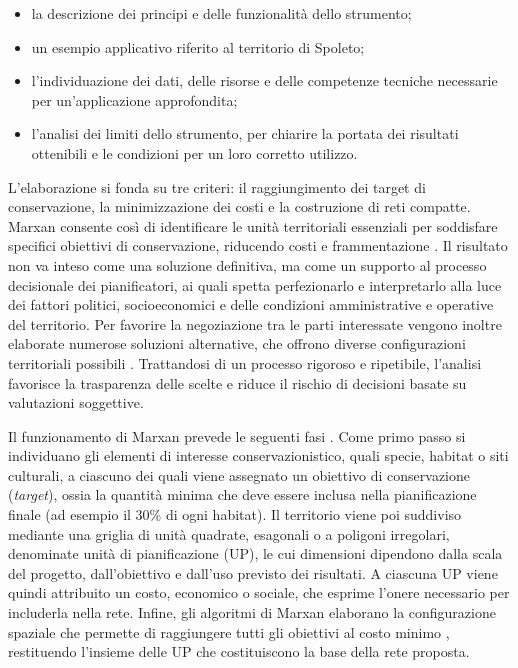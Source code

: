 \documentclass[
  a4paper,
]{book}
\providecommand{\tightlist}{%
  \setlength{\itemsep}{0pt}\setlength{\parskip}{0pt}}
\begin{document}
\begin{itemize}
\tightlist
\item
  la descrizione dei principi e delle funzionalità dello strumento;
\item
  un esempio applicativo riferito al territorio di Spoleto;
\item
  l'individuazione dei dati, delle risorse e delle competenze tecniche necessarie per un'applicazione approfondita;
\item
  l'analisi dei limiti dello strumento, per chiarire la portata dei risultati ottenibili e le condizioni per un loro corretto utilizzo.
\end{itemize}

L'elaborazione si fonda su tre criteri: il raggiungimento dei target di conservazione, la minimizzazione dei costi e la costruzione di reti compatte.
Marxan consente così di identificare le unità territoriali essenziali per soddisfare specifici obiettivi di conservazione, riducendo costi e frammentazione \citep{ball2009}.
Il risultato non va inteso come una soluzione definitiva, ma come un supporto al processo decisionale dei pianificatori, ai quali spetta perfezionarlo e interpretarlo alla luce dei fattori politici, socioeconomici e delle condizioni amministrative e operative del territorio.
Per favorire la negoziazione tra le parti interessate vengono inoltre elaborate numerose soluzioni alternative, che offrono diverse configurazioni territoriali possibili \citep{ardron2010, serra-sogas2020}.
Trattandosi di un processo rigoroso e ripetibile, l'analisi favorisce la trasparenza delle scelte e riduce il rischio di decisioni basate su valutazioni soggettive.

Il funzionamento di Marxan prevede le seguenti fasi \citep{serra-sogas2020}.
Come primo passo si individuano gli elementi di interesse conservazionistico, quali specie, habitat o siti culturali, a ciascuno dei quali viene assegnato un obiettivo di conservazione (\emph{target}), ossia la quantità minima che deve essere inclusa nella pianificazione finale (ad esempio il 30\% di ogni habitat).
Il territorio viene poi suddiviso mediante una griglia di unità quadrate, esagonali o a poligoni irregolari, denominate unità di pianificazione (UP), le cui dimensioni dipendono dalla scala del progetto, dall'obiettivo e dall'uso previsto dei risultati.
A ciascuna UP viene quindi attribuito un costo, economico o sociale, che esprime l'onere necessario per includerla nella rete.
Infine, gli algoritmi di Marxan elaborano la configurazione spaziale che permette di raggiungere tutti gli obiettivi al costo minimo \citep{cudlín2020, daigle2020}, restituendo l'insieme delle UP che costituiscono la base della rete proposta.
\end{document}
